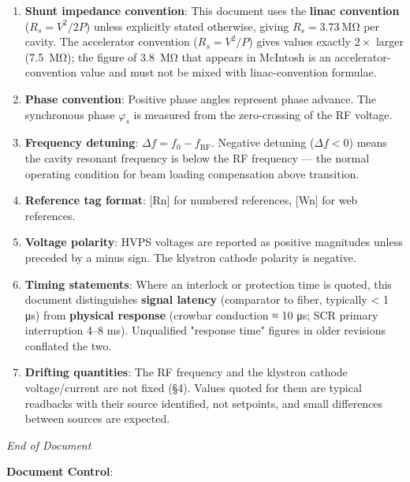 \begin{enumerate}
\def\labelenumi{\arabic{enumi}.}
\item
  \textbf{Shunt impedance convention}: This document uses the \textbf{linac convention} ($R_s = V^{2}/2P$) unless explicitly stated otherwise, giving $R_s = \qty{3.73}{\mega\ohm}$ per cavity. The accelerator convention ($R_s = V^{2}/P$) gives values exactly $2\times$ larger (\qty{7.5}{\mega\ohm}); the figure of \qty{3.8}{\mega\ohm} that appears in McIntosh  is an accelerator-convention value and must not be mixed with linac-convention formulae.
\item
  \textbf{Phase convention}: Positive phase angles represent phase advance. The synchronous phase $\varphi_s$ is measured from the zero-crossing of the RF voltage.
\item
  \textbf{Frequency detuning}: $\Delta f = f_0 - f_\text{RF}$. Negative detuning ($\Delta f < 0$) means the cavity resonant frequency is below the RF frequency --- the normal operating condition for beam loading compensation above transition.
\item
  \textbf{Reference tag format}: {[}Rn{]} for numbered references, {[}Wn{]} for web references.
\item
  \textbf{Voltage polarity}: HVPS voltages are reported as positive magnitudes unless preceded by a minus sign. The klystron cathode polarity is negative.
\item
  \textbf{Timing statements}: Where an interlock or protection time is quoted, this document distinguishes \textbf{signal latency} (comparator to fiber, typically \textless{} 1 μs) from \textbf{physical response} (crowbar conduction ≈ 10 μs; SCR primary interruption 4--8 ms). Unqualified "response time" figures in older revisions conflated the two.
\item
  \textbf{Drifting quantities}: The RF frequency and the klystron cathode voltage/current are not fixed (§4). Values quoted for them are typical readbacks with their source identified, not setpoints, and small differences between sources are expected.
\end{enumerate}



\emph{End of Document}

\textbf{Document Control}:

